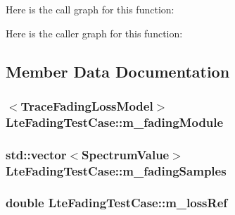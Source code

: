 Here is the call graph for this function\+:




Here is the caller graph for this function\+:




\subsection{Member Data Documentation}
\subsubsection[{\texorpdfstring{m\+\_\+fading\+Module}{m_fadingModule}}]{$<${\bf Trace\+Fading\+Loss\+Model}$>$ Lte\+Fading\+Test\+Case\+::m\+\_\+fading\+Module\hspace{0.3cm}{\ttfamily [private]}}\hypertarget{classLteFadingTestCase_a0d917234b65dc135ed04a2c09f9aae7b}{}\label{classLteFadingTestCase_a0d917234b65dc135ed04a2c09f9aae7b}
\subsubsection[{\texorpdfstring{m\+\_\+fading\+Samples}{m_fadingSamples}}]{\setlength{\rightskip}{0pt plus 5cm}std\+::vector$<${\bf Spectrum\+Value}$>$ Lte\+Fading\+Test\+Case\+::m\+\_\+fading\+Samples\hspace{0.3cm}{\ttfamily [private]}}\hypertarget{classLteFadingTestCase_a80f3baa4e47676602f9becabc28fc975}{}\label{classLteFadingTestCase_a80f3baa4e47676602f9becabc28fc975}
\subsubsection[{\texorpdfstring{m\+\_\+loss\+Ref}{m_lossRef}}]{\setlength{\rightskip}{0pt plus 5cm}double Lte\+Fading\+Test\+Case\+::m\+\_\+loss\+Ref\hspace{0.3cm}{\ttfamily [private]}}\hypertarget{classLteFadingTestCase_a6bdc7bd64691c8f657cf9810a4fc91db}{}\label{classLteFadingTestCase_a6bdc7bd64691c8f657cf9810a4fc91db}
